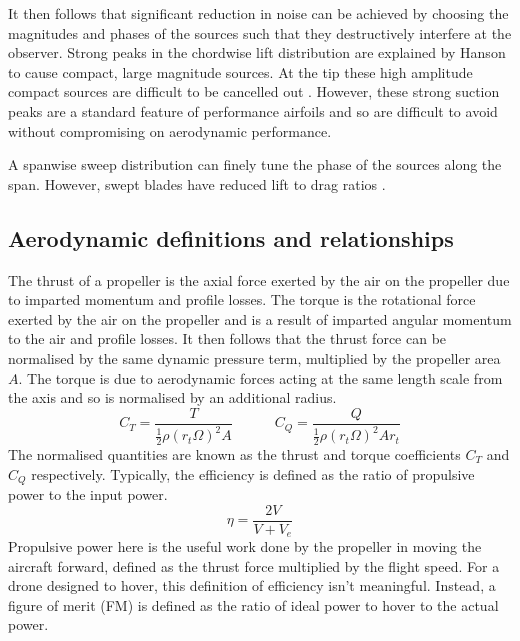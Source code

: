 \documentclass[12pt,a4paper]{article}
\begin{document}
It then follows that significant reduction in noise can be achieved by choosing the magnitudes and phases of the sources such that they destructively interfere at the observer.
Strong peaks in the chordwise lift distribution are explained by Hanson \cite{hanson_influence} to cause compact, large magnitude sources.
At the tip these high amplitude compact sources are difficult to be cancelled out \cite{hanson_influence}.
However, these strong suction peaks are a standard feature of performance airfoils 
and so are difficult to avoid without compromising on aerodynamic performance.

A spanwise sweep distribution can finely tune the phase of the sources along the span.
However, swept blades have reduced lift to drag ratios \cite{Wiedemann_swept}.

\subsection{Aerodynamic definitions and relationships}
The thrust of a propeller is the axial force exerted by the air on the propeller due to imparted momentum and profile losses.
The torque is the rotational force exerted by the air on the propeller and is a result of imparted angular momentum to the air and profile losses.
It then follows that the thrust force can be normalised by the same dynamic pressure term, multiplied by the propeller area $A$.
The torque is due to aerodynamic forces acting at the same length scale from the axis and so is normalised by an additional radius.
\begin{equation}
    C_T = \frac{T}{\frac{1}{2} \rho (r_t\Omega)^2 A} \quad \quad \quad C_Q = \frac{Q}{\frac{1}{2} \rho (r_t\Omega)^2 A r_t} \label{eq:CT_CQ}
\end{equation}
The normalised quantities are known as the thrust and torque coefficients $C_T$ and $C_Q$ respectively.
Typically, the efficiency is defined as the ratio of propulsive power to the input power.
\begin{equation}
    \eta = \frac{2 V}{V + V_e}
\end{equation}
Propulsive power here is the useful work done by the propeller in moving the aircraft forward, defined as the thrust force multiplied by the flight speed.
For a drone designed to hover, this definition of efficiency isn't meaningful.
Instead, a figure of merit (FM) is defined as the ratio of ideal power to hover to the actual power.
\end{document}
